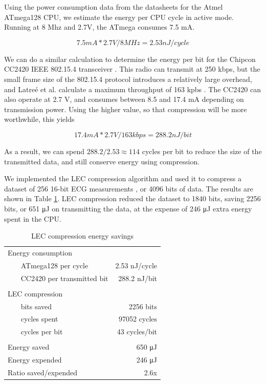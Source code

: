 Using the power consumption data from the datasheets for the Atmel ATmega128 \cite{Atmel:ATmega128Datasheet} CPU, we estimate the energy per CPU cycle in active mode. Running at 8 Mhz and 2.7V, the ATmega consumes 7.5 mA.

\begin{equation}
    7.5mA * 2.7V / 8MHz = 2.53nJ / cycle  
\end{equation}

We can do a similar calculation to determine the energy per bit for the Chipcon CC2420 IEEE 802.15.4 transceiver \cite{Chipcon:CC2420Datasheet}. This radio can transmit at 250 kbps, but the small frame size of the 802.15.4 protocol introduces a relatively large overhead, and Latre\'e et al. calculate a maximum throughput of 163 kpbs \cite{Latre:2006wr}. The CC2420 can also operate at 2.7 V, and consumes between 8.5 and 17.4 mA depending on transmission power. Using the higher value, so that compression will be more worthwhile, this yields

\begin{equation}
  17.4 mA * 2.7 V / 163 kbps = 288.2 nJ / bit
\end{equation}

As a result, we can spend $288.2/2.53 \approx 114$ cycles per bit to reduce the size of the transmitted data, and still conserve energy using compression.

We implemented the LEC compression algorithm and used it to compress a dataset of 256 16-bit ECG measurements \cite{physionet-ecg-data}, or 4096 bits of data. The results are shown in Table \ref{tbl-lec-energy}. LEC compression reduced the dataset to 1840 bits, saving 2256 bits, or 651 μJ on transmitting the data, at the expense of 246 μJ extra energy spent in the CPU.

\begin{table}
\caption{LEC compression energy savings}
\label{tbl-lec-energy}
    \begin{tabular}{lr} %
    \toprule
    Energy consumption \\
    ~~~ ATmega128 per cycle            & 2.53 nJ/cycle  \\
    ~~~ CC2420 per transmitted bit     & 288.2 nJ/bit  \\
    \\
    LEC compression \\
    ~~~ bits saved                     & 2256 bits \\
    ~~~ cycles spent                   & 97052 cycles\\
    ~~~ cycles per bit                 & 43 cycles/bit \\
    \\
    Energy saved                       & 650 μJ \\
    Energy expended                    & 246 μJ \\
    Ratio saved/expended               & 2.6x \\
    \bottomrule
    \end{tabular}
\end{table}

